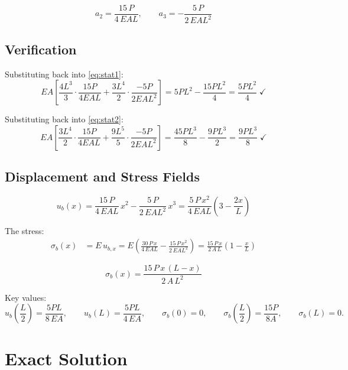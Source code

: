 \documentclass[11pt, a4paper]{article}
\begin{document}
\begin{equation}\label{eq:a_partb}
\boxed{a_2 = \frac{15\,P}{4\,EAL},\qquad a_3 = -\frac{5\,P}{2\,EAL^2}}
\end{equation}

\subsection{Verification}

Substituting back into \cref{eq:stat1}:
\[
EA\left[\frac{4L^3}{3}\cdot\frac{15P}{4EAL} + \frac{3L^4}{2}\cdot\frac{-5P}{2EAL^2}\right] = 5PL^2 - \frac{15PL^2}{4} = \frac{5PL^2}{4}\;\checkmark
\]

Substituting back into \cref{eq:stat2}:
\[
EA\left[\frac{3L^4}{2}\cdot\frac{15P}{4EAL} + \frac{9L^5}{5}\cdot\frac{-5P}{2EAL^2}\right] = \frac{45PL^3}{8} - \frac{9PL^3}{2} = \frac{9PL^3}{8}\;\checkmark
\]

\subsection{Displacement and Stress Fields}

\begin{equation}\label{eq:u_b}
\boxed{u_b(x) = \frac{15\,P}{4\,EAL}\,x^2 - \frac{5\,P}{2\,EAL^2}\,x^3 = \frac{5\,P\,x^2}{4\,EAL}\!\left(3 - \frac{2x}{L}\right)}
\end{equation}

The stress:
\begin{align}
\sigma_b(x) &= E\,u_{b,x} = E\left(\frac{30\,P\,x}{4\,EAL} - \frac{15\,P\,x^2}{2\,EAL^2}\right) = \frac{15\,P\,x}{2\,A\,L}\!\left(1 - \frac{x}{L}\right) \label{eq:sigma_b}
\end{align}

\begin{equation}\label{eq:sigma_b_box}
\boxed{\sigma_b(x) = \frac{15\,P\,x\,(L - x)}{2\,A\,L^2}}
\end{equation}

\noindent Key values:
\[
u_b\!\left(\frac{L}{2}\right) = \frac{5PL}{8\,EA},\qquad
u_b(L) = \frac{5PL}{4\,EA},\qquad
\sigma_b(0) = 0,\qquad
\sigma_b\!\left(\frac{L}{2}\right) = \frac{15P}{8A},\qquad
\sigma_b(L) = 0.
\]

\section{Exact Solution}\label{sec:exact}
\end{document}

